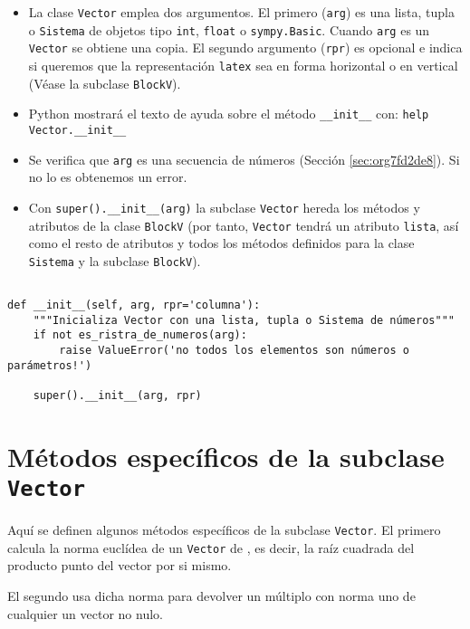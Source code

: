 \documentclass[11pt]{report}
\begin{document}
\begin{itemize}
\item La clase \texttt{Vector} emplea dos argumentos. El primero (\texttt{arg}) es una
lista, tupla o \texttt{Sistema} de objetos tipo \texttt{int}, \texttt{float} o
\texttt{sympy.Basic}. Cuando \texttt{arg} es un \texttt{Vector} se obtiene una copia. El
segundo argumento (\texttt{rpr}) es opcional e indica si queremos que la
representación \texttt{latex} sea en forma horizontal o en vertical (Véase
la subclase \texttt{BlockV}).

\item Python mostrará el texto de ayuda sobre el método \texttt{\_\_init\_\_} con:
\texttt{help Vector.\_\_init\_\_}

\item Se verifica que \texttt{arg} es una secuencia de números (Sección
\ref{sec:org7fd2de8}). Si no lo es obtenemos un error.

\item Con \texttt{super().\_\_init\_\_(arg)} la subclase \texttt{Vector} hereda los métodos
y atributos de la clase \texttt{BlockV} (por tanto, \texttt{Vector} tendrá un
atributo \texttt{lista}, así como el resto de atributos y todos los métodos
definidos para la clase \texttt{Sistema} y la subclase \texttt{BlockV}).
\end{itemize}


\begin{verbatim}

def __init__(self, arg, rpr='columna'):
    """Inicializa Vector con una lista, tupla o Sistema de números"""                       
    if not es_ristra_de_numeros(arg):
        raise ValueError('no todos los elementos son números o parámetros!')

    super().__init__(arg, rpr)

\end{verbatim}

\section{Métodos específicos de la subclase \texttt{Vector}}
\label{sec:org88df71c}

Aquí se definen algunos métodos específicos de la subclase
\texttt{Vector}. El primero calcula la norma euclídea de un \texttt{Vector} de
\R[n], es decir, la raíz cuadrada del producto punto del vector por si
mismo.

El segundo usa dicha norma para devolver un múltiplo con norma uno de
cualquier un vector no nulo.
\end{document}
